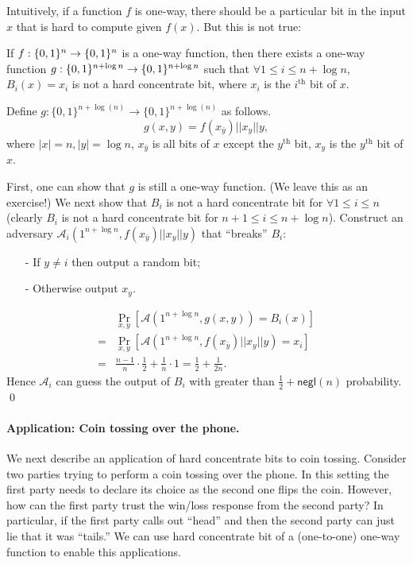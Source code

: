 \bigskip
Intuitively, if a function $f$ is one-way, there should be a particular bit in the input $x$ that is hard to compute given $f(x)$. But this is not true:
\begin{claim}
If $f:\{0,1\}^{n}\rightarrow \{0,1\}^{n}$ is a one-way function, then there exists a one-way function $g:\{0,1\}^{n+\log n}\rightarrow\{0,1\}^{n+\log n}$ such that $\forall 1 \leq i \leq n+\log n$, $B_i(x) = x_i$ is not a hard concentrate bit, where $x_i$ is the $i^\text{th}$ bit of $x$.
\end{claim}
\proof
Define $g:\{0,1\}^{n+\log(n)} \rightarrow \{0,1\}^{n+\log(n)}$ as follows.
$$g(x,y) = f(x_{\bar y}) || x_y || y,$$
where $|x| = n, |y| = \log n$, $x_{\bar y}$ is all bits of $x$ except the $y^\text{th}$ bit, $x_y$ is the $y^\text{th}$ bit of $x$.

First, one can show that $g$ is still a one-way function. (We leave this as an exercise!)
We next show that $B_i$ is not a hard concentrate bit for $\forall 1 \leq i \leq n$ (clearly $B_i$ is not a hard concentrate bit for $n+1 \leq i \leq n+\log n$).
Construct an adversary $\mathcal{A}_i(1^{n+\log n}, f(x_{\bar y}) || x_y || y)$ that ``breaks'' $B_i$:
\begin{itemize}
\item[-] If $y \not= i$ then output a random bit;
\item[-] Otherwise output $x_y$.
\end{itemize}
\begin{align*}
& \Pr_{x, y}[\mathcal{A}(1^{n+\log n}, g(x,y)) = B_i(x)]\\
=& \Pr_{x, y}[\mathcal{A}(1^{n+\log n}, f(x_{\bar y}) || x_y || y) = x_i]\\
=& \frac{n-1}{n} \cdot \frac{1}{2} + \frac{1}{n} \cdot 1 = \frac{1}{2} + \frac{1}{2n}.
\end{align*}
Hence $\mathcal{A}_i$ can guess the output of $B_i$ with greater than $\frac{1}{2} + \mathsf{negl}(n)$ probability.
\qed



\paragraph{Application: Coin tossing over the phone.} We next describe an application of hard concentrate bits to coin tossing.
Consider two parties trying to perform a coin tossing over the phone. In this setting the first party needs to declare its choice as the second one flips the coin. However, how can the first party trust the win/loss response from the second party?  In particular, if the first party calls out ``head'' and then the second party can just lie that it was ``tails.'' We can use hard concentrate bit of a (one-to-one) one-way function to  enable this applications.


